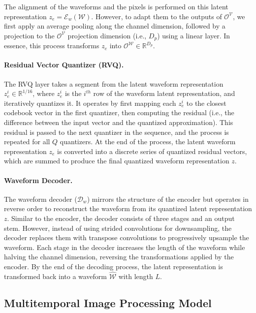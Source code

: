The alignment of the waveforms and the pixels is performed on this latent representation $z_e = \mathcal{E}_w(\mathcal{W})$. However, to adapt them to the outputs of $\mathcal{O}^\mathcal{V}$, we first apply an average pooling along the channel dimension, followed by a projection to the $\mathcal{O}^\mathcal{V}$ projection dimension (i.e., $D_p$) using a linear layer. In essence, this process transforms $z_e$ into $\mathcal{O}^\mathcal{W} \in \mathbb{R}^{D_p}$.

\paragraph{Residual Vector Quantizer (RVQ).} The RVQ layer takes a segment from the latent waveform representation $z^i_e \in \mathbb{R}^{1/16}$, where $z^i_e$ is the $i^{th}$ row of the waveform latent representation, and iteratively quantizes it. It operates by first mapping each $z^i_e$ to the closest codebook vector in the first quantizer, then computing the residual (i.e., the difference between the input vector and the quantized approximation). This residual is passed to the next quantizer in the sequence, and the process is repeated for all $Q$ quantizers. At the end of the process, the latent waveform representation $z_e$ is converted into a discrete series of quantized residual vectors, which are summed to produce the final quantized waveform representation $z$. 

\paragraph{Waveform Decoder.} The waveform decoder ($\mathcal{D}_w$) mirrors the structure of the encoder but operates in reverse order to reconstruct the waveform from its quantized latent representation $z$. Similar to the encoder, the decoder consists of three stages and an output stem. However, instead of using strided convolutions for downsampling, the decoder replaces them with transpose convolutions to progressively upsample the waveform. Each stage in the decoder increases the length of the waveform while halving the channel dimension, reversing the transformations applied by the encoder. By the end of the decoding process, the latent representation is transformed back into a waveform $\hat{\mathcal{W}}$ with length \( L \).

\subsection{Multitemporal Image Processing Model}%

